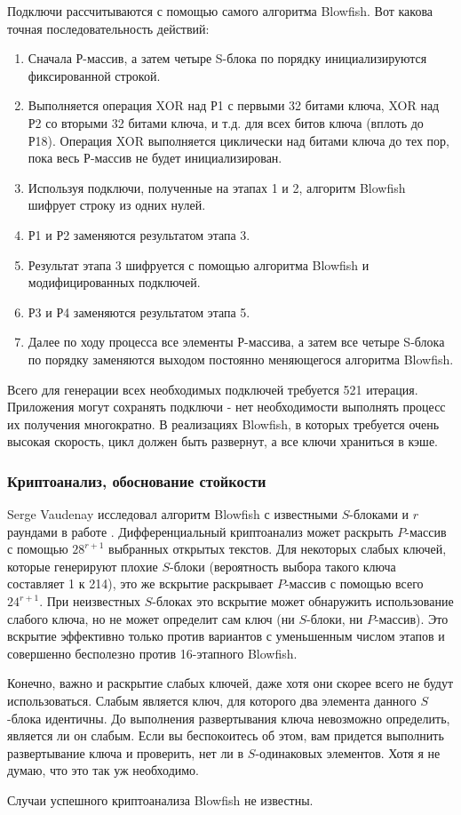 Подключи рассчитываются с помощью самого алгоритма Blowfish. 
Вот какова точная последовательность действий:
\begin{enumerate}
\item Сначала Р-массив, а затем четыре S-блока по порядку инициализируются 
    фиксированной строкой.
\item Выполняется операция XOR над Р1 с первыми 32 битами ключа, 
    XOR над Р2 со вторыми 32 битами ключа, и т.д. для всех битов 
    ключа (вплоть до Р18). Операция XOR выполняется циклически над 
    битами ключа до тех пор, пока весь Р-массив не будет инициализирован.
\item Используя подключи, полученные на этапах 1 и 2, алгоритм 
    Blowfish шифрует строку из одних нулей.
\item Р1 и Р2 заменяются результатом этапа 3.
\item Результат этапа 3 шифруется с помощью алгоритма Blowfish 
    и модифицированных подключей.
\item Р3 и Р4 заменяются результатом этапа 5.
\item Далее по ходу процесса все элементы Р-массива, а затем 
    все четыре S-блока по порядку заменяются выходом постоянно меняющегося 
    алгоритма Blowfish.
\end{enumerate}

Всего для генерации всех необходимых подключей требуется 521 
итерация. Приложения могут сохранять подключи - нет необходимости 
выполнять процесс их получения многократно.
В реализациях Blowfish, в которых требуется очень высокая скорость,
цикл должен быть развернут, а все ключи храниться в кэше.

\subsubsection{Криптоанализ, обоснование стойкости}
Serge Vaudenay исследовал алгоритм Blowfish с известными 
$S$-блоками и $r$ раундами в работе \cite{vaudenay-blowfish}.
Дифференциальный криптоанализ может раскрыть 
$P$-массив с помощью $28^{r + 1}$ выбранных открытых текстов. Для 
некоторых слабых ключей, которые генерируют плохие $S$-блоки (вероятность 
выбора такого ключа составляет 1 к 214), это же вскрытие раскрывает 
$P$-массив с помощью всего $24^{r + 1}$. При неизвестных $S$-блоках это 
вскрытие может обнаружить использование слабого ключа, но не 
может определит сам ключ (ни $S$-блоки, ни $P$-массив). Это вскрытие 
эффективно только против вариантов с уменьшенным числом этапов 
и совершенно бесполезно против 16-этапного Blowfish.

Конечно, важно и раскрытие слабых ключей, даже хотя они скорее 
всего не будут использоваться. Слабым является ключ, для которого 
два элемента данного $S$-блока идентичны. До выполнения развертывания 
ключа невозможно определить, является ли он слабым. Если вы беспокоитесь 
об этом, вам придется выполнить развертывание ключа и проверить,
нет ли в $S$-одинаковых элементов. Хотя я не думаю, что это так 
уж необходимо.

Случаи успешного криптоанализа Blowfish не известны.
